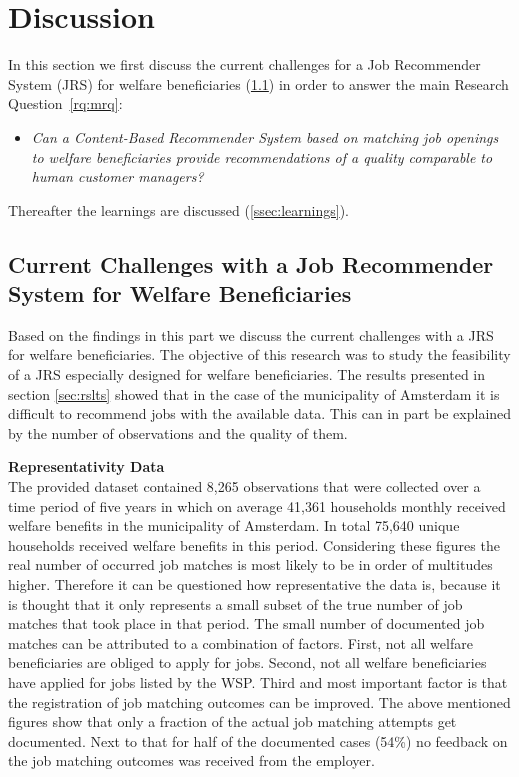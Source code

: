 \section{Discussion}
\label{sec:disc}
In this section we first discuss the current challenges for a Job Recommender System (JRS) for 
welfare beneficiaries (\ref{ssec:jrswb}) in order to answer the main Research Question~\ref{rq:mrq}: 
\begin{itemize}
	\item[] \em Can a Content-Based Recommender System based on matching job openings to welfare beneficiaries provide recommendations of a quality comparable to human customer managers?
\end{itemize}
Thereafter the learnings are discussed (\ref{ssec:learnings}). 

\subsection{Current Challenges with a Job Recommender System for Welfare Beneficiaries}
\label{ssec:jrswb}
Based on the findings in this part we discuss the current challenges with a JRS for welfare beneficiaries.
The objective of this research was to study the feasibility of a JRS especially designed for welfare beneficiaries. 
The results presented in section \ref{sec:rslts} showed that in the case of the municipality of Amsterdam it is difficult to recommend jobs with the available data.
This can in part be explained by the number of observations and the quality of them.

\noindent
\textbf{Representativity Data}\\
The provided dataset contained 8,265 observations that were collected over a time period of five years in which on average 41,361 households monthly received welfare benefits in the municipality of Amsterdam.
In total 75,640 unique households received welfare benefits in this period.
Considering these figures the real number of occurred job matches is most likely to be in order of multitudes higher.
Therefore it can be questioned how representative the data is, because it is thought that it only represents a small subset of the true number of job matches that took place in that period.  
The small number of documented job matches can be attributed to a combination of factors.
First, not all welfare beneficiaries are obliged to apply for jobs.
Second, not all welfare beneficiaries have applied for jobs listed by the WSP.
Third and most important factor is that the registration of job matching outcomes can be improved.
The above mentioned figures show that only a fraction of the actual job matching attempts get documented. 
Next to that for half of the documented cases (54\%) no feedback on the job matching outcomes was received from the employer.

